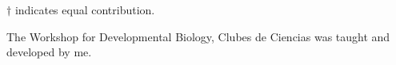 \footnotesize{
    $\dagger$ indicates equal contribution.\par
    The Workshop for Developmental Biology, Clubes de Ciencias was taught and developed by me.}

\nocite{*}

\printbibliography[heading={none}]






